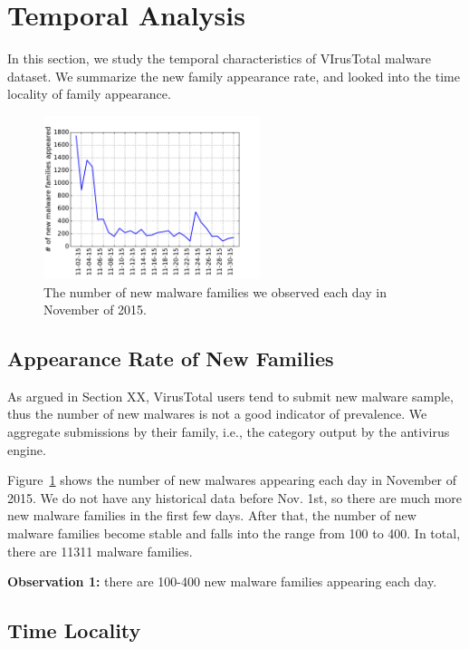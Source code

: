 
\section{Temporal Analysis}
\label{sec:temporal}

In this section, we study the temporal characteristics of VIrusTotal malware dataset. We summarize the new family appearance rate, and looked into the time locality of family appearance.

\begin{figure}[t!]
\begin{center}
\includegraphics[width=2.5in]{figure/new_family}
\caption{The number of new malware families we observed each day in November of 2015.}
\label{fig:new}
\end{center}
\end{figure}
\subsection{Appearance Rate of New Families}
As argued in Section XX, VirusTotal users tend to submit new malware sample, thus the number of new malwares is not a good indicator of prevalence. We aggregate submissions by their family, i.e., the category output by the antivirus engine.

Figure~\ref{fig:new} shows the number of new malwares appearing each day in November of 2015. We do not have any historical data before Nov. 1st, 
so there are much more new malware families in the first few days.
After that, the number of new malware families become stable and falls into the range from 100 to 400. 
In total, there are 11311 malware families. 

{\bf Observation 1:} 
there are 100-400 new malware families appearing each day. 

\subsection{Time Locality}


